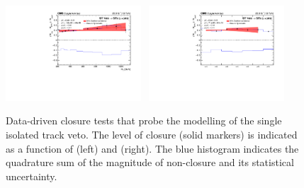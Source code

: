 \begin{figure}[h!]
  \begin{center}
    \includegraphics[width=0.45\textwidth]{figures/closureTests/SITV/SingleMu_Sit_ht.pdf}~
    \includegraphics[width=0.45\textwidth]{figures/closureTests/SITV/SingleMu_Sit_nJet.pdf}\\
    \caption{Data-driven closure tests that probe the modelling of the
      single isolated track veto. The level of closure (solid markers)
      is indicated as a function of \scalht (left) and \njet
      (right). The blue histogram indicates the quadrature sum of the
      magnitude of non-closure and its statistical uncertainty. }
    \label{fig:closure_SITV_mu}
  \end{center} 
\end{figure}

